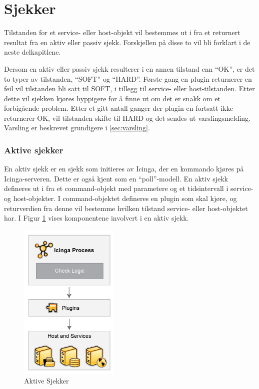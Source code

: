 \section{Sjekker}\label{sec:sjekker}
Tilstanden for et service- eller host-objekt vil bestemmes ut i fra et returnert resultat fra en aktiv eller passiv sjekk. Forskjellen på disse to vil bli forklart i de neste delkapitlene.

Dersom en aktiv eller passiv sjekk resulterer i en annen tilstand enn ``OK'', er det to typer av tilstanden, ``SOFT'' og ``HARD''. Første gang en plugin returnerer en feil vil tilstanden bli satt til SOFT, i tillegg til service- eller host-tilstanden. Etter dette vil sjekken kjøres hyppigere for å finne ut om det er snakk om et forbigående problem. Etter et gitt antall ganger der plugin-en fortsatt ikke returnerer OK, vil tilstanden skifte til HARD og det sendes ut varslingsmelding. Varsling er beskrevet grundigere i \ref{sec:varsling}.

\clearpage
\subsubsection{Aktive sjekker}
En aktiv sjekk er en sjekk som initieres av Icinga, der en kommando kjøres på Icinga-serveren. Dette er også kjent som en ``poll''-modell. En aktiv sjekk defineres ut i fra et command-objekt med parametere og et tidsintervall i service- og host-objekter. I command-objektet defineres en plugin som skal kjøre, og returverdien fra denne vil bestemme hvilken tilstand service- eller host-objektet har. I Figur \ref{active_checks} vises komponentene involvert i en aktiv sjekk.
\begin{figure}
   \centering 
   \includegraphics[scale=0.7]{img/activechecks.png}
    \caption{Aktive Sjekker}
    \label{active_checks}
\end{figure}

